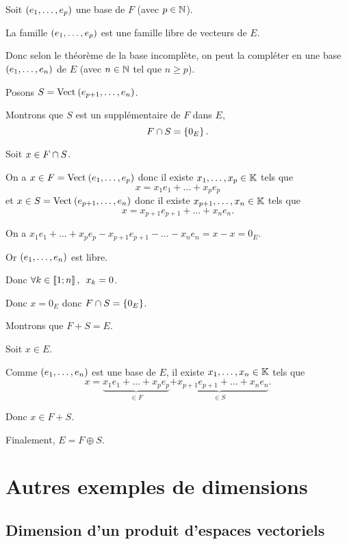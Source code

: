 \begin{dem}
Soit \(\left(e_1,\dots,e_p\right)\) une base de \(F\) (avec \(p\in\mathbb{N}\)).

La famille \(\left(e_1,\dots,e_p\right)\) est une famille libre de vecteurs de \(E\).

Donc selon le théorème de la base incomplète, on peut la compléter en une base \(\left(e_1,\dots,e_n\right)\) de \(E\) (avec \(n\in\mathbb{N}\) tel que \(n\geq p\)).

Posons \(S=\Vect{e_{p+1},\dots,e_n}\).

Montrons que \(S\) est un supplémentaire de \(F\) dans \(E\), \cad \[F\cap S=\left\lbrace0_E\right\rbrace.\]

Soit \(x\in F\cap S\).

On a \(x\in F=\Vect{e_1,\dots,e_p}\) donc il existe \(x_1,\dots,x_p\in\mathbb{K}\) tels que \[x=x_1e_1+\dots+x_pe_p\] et \(x\in S=\Vect{e_{p+1},\dots,e_n}\) donc il existe \(x_{p+1},\dots,x_n\in\mathbb{K}\) tels que \[x=x_{p+1}e_{p+1}+\dots+x_ne_n.\]

On a \(x_1e_1+\dots+x_pe_p-x_{p+1}e_{p+1}-\dots-x_ne_n=x-x=0_E\).

Or \(\left(e_1,\dots,e_n\right)\) est libre.

Donc \(\quantifs{\forall k\in\interventierii{1}{n}}x_k=0\).

Donc \(x=0_E\) donc \(F\cap S=\left\lbrace0_E\right\rbrace\).

Montrons que \(F+S=E\).

Soit \(x\in E\).

Comme \(\left(e_1,\dots,e_n\right)\) est une base de \(E\), il existe \(x_1,\dots,x_n\in\mathbb{K}\) tels que \[x=\underbrace{x_1e_1+\dots+x_pe_p}_{\in F}\underbrace{+x_{p+1}e_{p+1}+\dots+x_ne_n}_{\in S}.\]

Donc \(x\in F+S\).

Finalement, \(E=F\oplus S\).
\end{dem}

\section{Autres exemples de dimensions}

\subsection{Dimension d'un produit d'espaces vectoriels}

